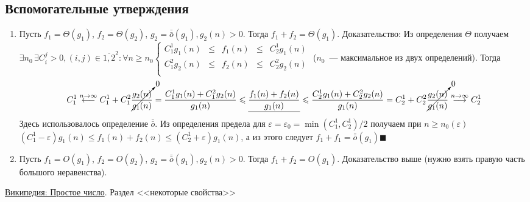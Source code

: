 \documentclass[a4paper]{article}
\def\eps{\varepsilon}
\newcommand{\smallo}{\bar{\bar{o}}}
\begin{document}
\subsection*{Вспомогательные утверждения}
\begin{enumerate}
\item \label{smallg2} Пусть $f_1=\Theta(g_1)$, $f_2=\Theta(g_2)$, $g_2=\smallo(g_1), g_2(n)>0$. Тогда $f_1+f_2=\Theta(g_1)$. Доказательство:\newline
Из определения $\Theta$ получаем $\exists n_0\,\exists C_i^j>0, (i,j)\in \overline{1,2}^2\colon\forall n\geqslant n_0 \left\{\begin{array}{lllll}
C_1^1g_1(n) & \leqslant & f_1(n) & \leqslant & C_2^1 g_1(n)\\
C_1^2g_2(n) & \leqslant & f_2(n) & \leqslant & C_2^2 g_2(n)\\
\end{array}\right.$ ($n_0$~--- максимальное из двух определений).
Тогда $$C_1^1\overset{n\to\infty}{\longleftarrow}C_1^1+C_1^2\cancelto{0}{\frac{g_2(n)}{g_1(n)}}=\frac{C_1^1 g_1(n)+C_1^2 g_2(n)}{g_1(n)}\leqslant\underline{\frac{f_1(n)+f_2(n)}{g_1(n)}}\leqslant \frac{C_2^1 g_1(n)+C_2^2 g_2(n)}{g_1(n)}=C_2^1+C_2^2\cancelto{0}{\frac{g_2(n)}{g_1(n)}}\overset{n\to\infty}{\longrightarrow}C_2^1$$
Здесь использовалось определение $\smallo$. Из определения предела для $\eps=\eps_0=\min(C_1^1,C_2^1)/2$ получаем при $n\geqslant n_0(\eps)$ $(C^1_1-\eps)g_1(n)\leqslant f_1(n)+f_2(n)\leqslant (C_2^1+\eps)g_1(n)$, а из этого следует $f_1+f_1=\smallo(g_1)\blacksquare$
\item \label{smallg2O} Пусть $f_1=O(g_1)$, $f_2=O(g_2)$, $g_2=\smallo(g_1), g_2(n)>0$. Тогда $f_1+f_2=O(g_1)$. Доказательство выше (нужно взять правую часть большого неравенства).
\end{enumerate}
\begin{thebibliography}{9}
\href{http://goo.gl/ckO9iy}{Википедия: Простое число}. Раздел <<некоторые свойства>>
\end{thebibliography}
\end{document}
